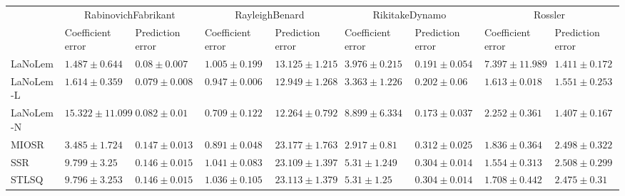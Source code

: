 \begin{table*}
{\begin{tabular}{lllllllll}
 & \multicolumn{2}{c}{RabinovichFabrikant} & \multicolumn{2}{c}{RayleighBenard} & \multicolumn{2}{c}{RikitakeDynamo} & \multicolumn{2}{c}{Rossler} \\
 & Coefficient error & Prediction error & Coefficient error & Prediction error & Coefficient error & Prediction error & Coefficient error & Prediction error \\
\midrule
LaNoLem & $\mathbf{1.487}\pm 0.644$ & $0.08\pm 0.007$ & $1.005\pm 0.199$ & $13.125\pm 1.215$ & $3.976\pm 0.215$ & $0.191\pm 0.054$ & $7.397\pm 11.989$ & $1.411\pm 0.172$ \\
LaNoLem-L & $1.614\pm 0.359$ & $\mathbf{0.079}\pm 0.008$ & $0.947\pm 0.006$ & $12.949\pm 1.268$ & $3.363\pm 1.226$ & $0.202\pm 0.06$ & $1.613\pm 0.018$ & $1.551\pm 0.253$ \\
LaNoLem-N & $15.322\pm 11.099$ & $0.082\pm 0.01$ & $\mathbf{0.709}\pm 0.122$ & $\mathbf{12.264}\pm 0.792$ & $8.899\pm 6.334$ & $\mathbf{0.173}\pm 0.037$ & $2.252\pm 0.361$ & $\mathbf{1.407}\pm 0.167$ \\
MIOSR & $3.485\pm 1.724$ & $0.147\pm 0.013$ & $0.891\pm 0.048$ & $23.177\pm 1.763$ & $\mathbf{2.917}\pm 0.81$ & $0.312\pm 0.025$ & $1.836\pm 0.364$ & $2.498\pm 0.322$ \\
SSR & $9.799\pm 3.25$ & $0.146\pm 0.015$ & $1.041\pm 0.083$ & $23.109\pm 1.397$ & $5.31\pm 1.249$ & $0.304\pm 0.014$ & $\mathbf{1.554}\pm 0.313$ & $2.508\pm 0.299$ \\
STLSQ & $9.796\pm 3.253$ & $0.146\pm 0.015$ & $1.036\pm 0.105$ & $23.113\pm 1.379$ & $5.31\pm 1.25$ & $0.304\pm 0.014$ & $1.708\pm 0.442$ & $2.475\pm 0.31$ \\

\midrule


\end{tabular}}
\end{table*}
